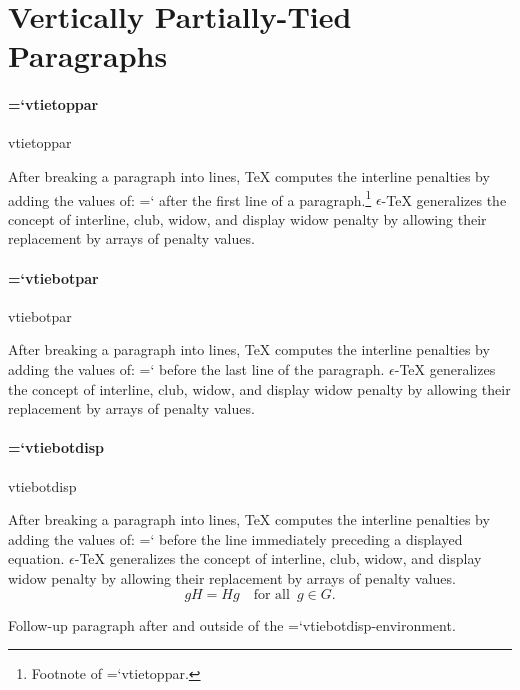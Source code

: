 \documentclass[a4paper]{article}
\newcommand*{\code}[1]{{\ttfamily\hyphenchar\font=`\-\relax #1}}
\newcommand*{\eTeX}{\mbox{\(\epsilon\)-\TeX}}
\begin{document}
\clearpage
\section{Vertically Partially-Tied Paragraphs}

\paragraph{\code{vtietoppar}}\leavevmode\par

\begin{typoginspect}{vtietoppar}
  \begin{vtietoppar}[2]
    After breaking a paragraph into lines, \TeX{} computes the interline
    penalties by adding the values of: \code{\string\clubpenalty} after
    the first line of a paragraph.\footnote{Footnote of \code{vtietoppar}.}
    \eTeX{} generalizes the concept of interline, club, widow, and display widow penalty
    by allowing their replacement by arrays of penalty values.
  \end{vtietoppar}
\end{typoginspect}

\paragraph{\code{vtiebotpar}}\leavevmode\par

\begin{typoginspect}{vtiebotpar}
  \begin{vtiebotpar}[2]
    After breaking a paragraph into lines, \TeX{} computes the interline
    penalties by adding the values of: \code{\string\widowpenalty}
    before the last line of the paragraph.
    \eTeX{} generalizes the concept of interline, club, widow, and display widow penalty
    by allowing their replacement by arrays of penalty values.
  \end{vtiebotpar}
\end{typoginspect}

\paragraph{\code{vtiebotdisp}}\leavevmode\par

\begin{typoginspect}[tracingboxes]{vtiebotdisp}
  \begin{vtiebotdisp}[2]
    After breaking a paragraph into lines, \TeX{} computes the interline
    penalties by adding the values of: \code{\string\displaywidowpenalty}
    before the line immediately preceding a displayed equation.
    \eTeX{} generalizes the concept of interline, club, widow, and display widow penalty
    by allowing their replacement by arrays of penalty values.
    \[g H = H g \quad \text{for all} \enspace g \in G.\]
  \end{vtiebotdisp}

  Follow-up paragraph after and outside of the \code{vtiebotdisp}-environment.
\end{typoginspect}
\end{document}
